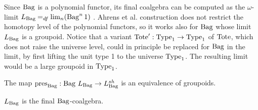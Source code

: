 \documentclass[final,a4paper,USenglish,cleveref]{lipics-v2021}
\begin{document}
Since $\Bag$ is a polynomial functor, its final coalgebra can be computed as the $\omega$-limit $\Lim{\Bag} \DefEq \lim_n (\Bag^n 1)$ \cite{Ahrens2015}. Ahrens et al. construction does not restrict the homotopy level of the polynomial functors, so it works also for $\Bag$ whose limit $\Lim{\Bag}$ is a groupoid. Notice that a variant $\Tote' : \Type_1 \to \Type_1$ of $\Tote$, which does not raise the universe level, could in principle be replaced for $\Bag$ in the limit, by first lifting the unit type 1 to the universe $\Type_1$. The resulting limit would be a large groupoid in $\Type_1$.
\begin{theorem}\label{thm:BagPresLim}
  The map $\pres{\Bag} : \Bag\,\Lim{\Bag} \to \LimSh{\Bag}$ is an equivalence of groupoids.
\end{theorem}

\begin{corollary}\label{cor:BagFinalCoalg}
  $\Lim{\Bag}$ is the final $\Bag$-coalgebra.
\end{corollary}
\end{document}
